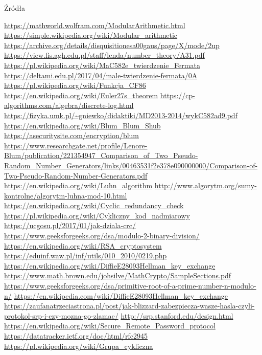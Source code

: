 \documentclass[polish,envcountsect,10pt]{beamer}
\begin{document}
\begin{frame}[allowframebreaks]{Źródła}
    \small
    \begin{thebibliography}{99}
         \url{https://mathworld.wolfram.com/ModularArithmetic.html}
         \url{https://simple.wikipedia.org/wiki/Modular_arithmetic}
         \url{https://archive.org/details/disquisitionesa00gaus/page/X/mode/2up}
         \url{https://view.fis.agh.edu.pl/staff/lenda/number_theory/A31.pdf}
         \url{https://pl.wikipedia.org/wiki/MaC582e_twierdzenie_Fermata}
         \url{https://deltami.edu.pl/2017/04/male-twierdzenie-fermata/0A}
         \url{https://pl.wikipedia.org/wiki/Funkcja_CF86}
         \url{https://en.wikipedia.org/wiki/Euler27s_theorem}
         \url{https://cp-algorithms.com/algebra/discrete-log.html}
         \url{https://fizyka.umk.pl/~gniewko/didaktiki/MD2013-2014/wykC582ad9.pdf}
         \url{https://en.wikipedia.org/wiki/Blum_Blum_Shub}
         \url{https://asecuritysite.com/encryption/blum}
         \url{https://www.researchgate.net/profile/Lenore-Blum/publication/221354947_Comparison_of_Two_Pseudo-Random_Number_Generators/links/00463531f2e378e090000000/Comparison-of-Two-Pseudo-Random-Number-Generators.pdf}
         \url{https://en.wikipedia.org/wiki/Luhn_algorithm}
         \url{http://www.algorytm.org/sumy-kontrolne/algorytm-luhna-mod-10.html}
         \url{https://en.wikipedia.org/wiki/Cyclic_redundancy_check}
         \url{https://pl.wikipedia.org/wiki/Cykliczny_kod_nadmiarowy}
         \url{https://ucgosu.pl/2017/01/jak-dziala-crc/}
         \url{https://www.geeksforgeeks.org/dsa/modulo-2-binary-division/}
         \url{https://en.wikipedia.org/wiki/RSA_cryptosystem}
         \url{https://eduinf.waw.pl/inf/utils/010_2010/0219.php}
         \url{https://en.wikipedia.org/wiki/DiffieE28093Hellman_key_exchange}
         \url{https://www.math.brown.edu/johsilve/MathCrypto/SampleSections.pdf}
         \url{https://www.geeksforgeeks.org/dsa/primitive-root-of-a-prime-number-n-modulo-n/}
         \url{https://en.wikipedia.com/wiki/DiffieE28093Hellman_key_exchange}
         \url{https://zaufanatrzeciastrona.pl/post/jak-blizzard-zabezpiecza-wasze-hasla-czyli-protokol-srp-i-czy-mozna-go-zlamac/}
         \url{http://srp.stanford.edu/design.html}
         \url{https://en.wikipedia.org/wiki/Secure_Remote_Password_protocol}
         \url{https://datatracker.ietf.org/doc/html/rfc2945}
         \url{https://pl.wikipedia.org/wiki/Grupa_cykliczna}
        
    \end{thebibliography}
\end{frame}
\end{document}
